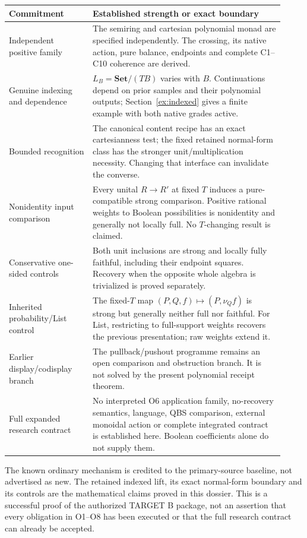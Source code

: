 \documentclass[11pt,a4paper]{article}
\theoremstyle{definition}
\newcommand{\Set}{\mathbf{Set}}
\begin{document}
\begin{longtable}{@{}p{0.28\linewidth}p{0.64\linewidth}@{}}
\toprule
Commitment & Established strength or exact boundary \\
\midrule
\endhead
Independent positive family &
The semiring and cartesian polynomial monad are specified independently.
The crossing, its native action, pure balance, endpoints and complete
C1--C10 coherence are derived. \\
Genuine indexing and dependence &
$L_B=\Set/(TB)$ varies with $B$. Continuations depend on prior samples
and their polynomial outputs; Section~\ref{ex:indexed} gives a finite
example with both native grades active. \\
Bounded recognition &
The canonical content recipe has an exact cartesianness test; the fixed
retained normal-form class has the stronger unit/multiplication necessity.
Changing that interface can invalidate the converse. \\
Nonidentity input comparison &
Every unital $R\to R'$ at fixed $T$ induces a pure-compatible strong
comparison. Positive rational weights to Boolean possibilities is
nonidentity and generally not locally full. No $T$-changing result is claimed. \\
Conservative one-sided controls &
Both unit inclusions are strong and locally fully faithful, including
their endpoint squares. Recovery when the opposite whole algebra is
trivialized is proved separately. \\
Inherited probability/List control &
The fixed-$T$ map $(P,Q,f)\mapsto(P,\nu_Qf)$ is strong but generally
neither full nor faithful. For List, restricting to full-support weights
recovers the previous presentation; raw weights extend it. \\
Earlier display/codisplay branch &
The pullback/pushout programme remains an open comparison and obstruction
branch. It is not solved by the present polynomial receipt theorem. \\
Full expanded research contract &
No interpreted O6 application family, no-recovery semantics, language,
QBS comparison, external monoidal action or complete integrated contract
is established here. Boolean coefficients alone do not supply them. \\
\bottomrule
\end{longtable}

The known ordinary mechanism is credited to the primary-source baseline,
not advertised as new. The retained indexed lift, its exact normal-form
boundary and its controls are the mathematical claims proved in this
dossier. This is a successful proof of the authorized TARGET B package,
not an assertion that every obligation in O1--O8 has been executed or that
the full research contract can already be accepted.
\end{document}
